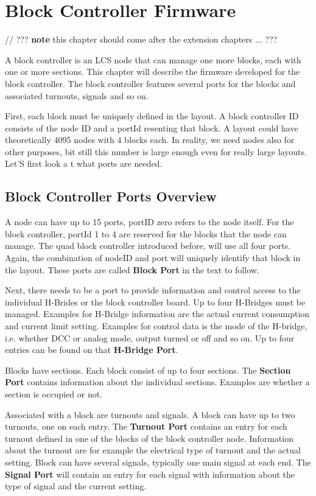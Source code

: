 \chapter{Block Controller Firmware}

// ??? \textbf{note} this chapter should come after the extension chapters ... ???

A block controller is an LCS node that can manage one more blocks, each with one or more sections. This chapter will describe the firmware developed for the block controller. The block controller features several ports for the blocks and associated turnouts, signals and so on.

First, each block must be uniquely defined in the layout. A block controller ID consists of the node ID and a portId resenting that block. A layout could have theoretically 4095 nodes with 4 blocks each. In reality, we need nodes also for other purposes, bit still this number is large enough even for really large layouts. Let'S first look a t what ports are needed.

\section{Block Controller Ports Overview}

A node can have up to 15 ports, portID zero refers to the node itself. For the block controller, portId 1 to 4 are reserved for the blocks that the node can manage. The quad block controller introduced before, will use all four ports. Again, the combination of nodeID and port will uniquely identify that block in the layout. These ports are called \textbf{Block Port} in the text to follow.

Next, there needs to be a port to provide information and control access to the individual H-Brides or the block controller board. Up to four H-Bridges must be managed. Examples for H-Bridge information are the actual current consumption and current limit setting. Examples for control data is the mode of the H-bridge, i.e. whether DCC or analog mode, output turned or off and so on. Up to four entries can be found on that \textbf{H-Bridge Port}.

Blocks have sections. Each block consist of up to four sections. The \textbf{Section Port} contains information about the individual sections. Examples are whether a section is occupied or not.

Associated with a block are turnouts and signals. A block can have up to two turnouts, one on each entry. The \textbf{Turnout Port} contains an entry for each turnout defined in one of the blocks of the block controller node. Information about the turnout are for example the electrical type of turnout and the actual setting. Block can have several signals, typically one main signal at each end. The \textbf{Signal Port} will contain an entry for each signal with information about the  type of signal and the current setting.

